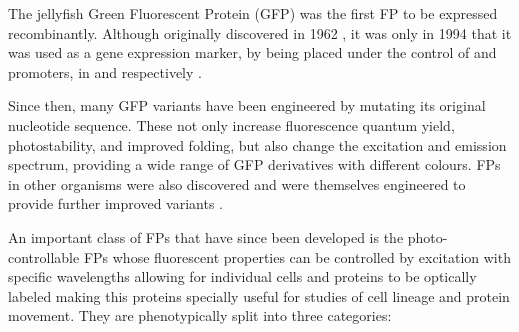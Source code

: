     The  jellyfish Green Fluorescent Protein (GFP) was
    the first FP to be expressed recombinantly.
    Although originally discovered in 1962 \citep{shimomura1962-gfp-discovery},
    it was only in 1994 that it was used as a gene expression
    marker, by being placed under the control of  and
     promoters, in  and 
    respectively \citep{gfp-first-expression-marker}.

    Since then, many GFP variants have been engineered by mutating its
    original nucleotide sequence.  These not only increase fluorescence
    quantum yield, photostability, and improved folding, but also change
    the excitation and emission spectrum, providing a wide range of GFP
    derivatives with different colours.  FPs in other organisms were also
    discovered and were themselves engineered to provide further improved
    variants \citep{FP-color-palette}.

    An important class of FPs that have since been developed is the
    photo-controllable FPs whose
    fluorescent properties can be controlled by excitation with specific
    wavelengths allowing for individual cells and proteins to be optically
    labeled making this proteins specially useful for studies of cell
    lineage and protein movement.
    They are phenotypically split into three categories:


